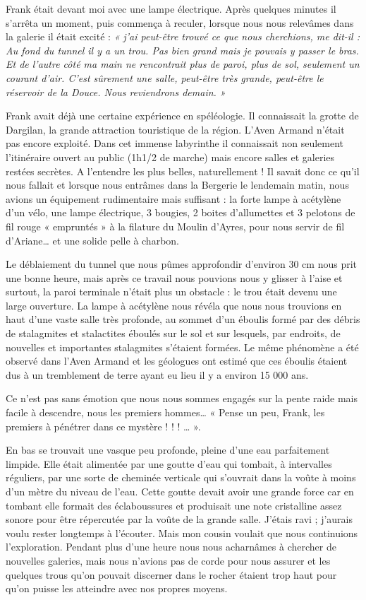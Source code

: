 Frank était devant moi avec une lampe électrique. Après quelques minutes il s’arrêta un
moment, puis commença à reculer, lorsque nous nous relevâmes dans la galerie il était excité :
\textit{« j’ai peut-être trouvé ce que nous cherchions, me dit-il : Au fond du tunnel il y a un trou.
Pas bien grand mais je pouvais y passer le bras. Et de l’autre côté ma main ne rencontrait
plus de paroi, plus de sol, seulement un courant d’air. C’est sûrement une salle, peut-être
très grande, peut-être le réservoir de la Douce. Nous reviendrons demain. »}

Frank avait déjà une certaine expérience en spéléologie. Il connaissait la grotte de Dargilan, la
grande attraction touristique de la région. L’Aven Armand n’était pas encore exploité. Dans
cet immense labyrinthe il connaissait non seulement l’itinéraire ouvert au public (1h1/2 de
marche) mais encore salles et galeries restées secrètes. A l’entendre les plus belles,
naturellement ! Il savait donc ce qu’il nous fallait et lorsque nous entrâmes dans la Bergerie le
lendemain matin, nous avions un équipement rudimentaire mais suffisant : la forte lampe à
acétylène d’un vélo, une lampe électrique, 3 bougies, 2 boites d’allumettes et 3 pelotons de fil
rouge « empruntés » à la filature du Moulin d’Ayres, pour nous servir de fil d’Ariane… et une
solide pelle à charbon.

Le déblaiement du tunnel que nous pûmes approfondir d’environ 30 cm nous prit une bonne
heure, mais après ce travail nous pouvions nous y glisser à l’aise et surtout, la paroi terminale
n’était plus un obstacle : le trou était devenu une large ouverture. La lampe à acétylène nous
révéla que nous nous trouvions en haut d’une vaste salle très profonde, au sommet d’un
éboulis formé par des débris de stalagmites et stalactites éboulés sur le sol et sur lesquels, par
endroits, de nouvelles et importantes stalagmites s’étaient formées. Le même phénomène a été
observé dans l’Aven Armand et les géologues ont estimé que ces éboulis étaient dus à un
tremblement de terre ayant eu lieu il y a environ 15 000 ans.

Ce n’est pas sans émotion que nous nous sommes engagés sur la pente raide mais facile à
descendre, nous les premiers hommes… « Pense un peu, Frank, les premiers à pénétrer dans
ce mystère ! ! ! … ».

En bas se trouvait une vasque peu profonde, pleine d’une eau parfaitement limpide. Elle était
alimentée par une goutte d’eau qui tombait, à intervalles réguliers, par une sorte de cheminée
verticale qui s’ouvrait dans la voûte à moins d’un mètre du niveau de l’eau. Cette goutte
devait avoir une grande force car en tombant elle formait des éclaboussures et produisait une
note cristalline assez sonore pour être répercutée par la voûte de la grande salle. J’étais ravi ;
j’aurais voulu rester longtemps à l’écouter. Mais mon cousin voulait que nous continuions
l’exploration. Pendant plus d’une heure nous nous acharnâmes à chercher de nouvelles
galeries, mais nous n’avions pas de corde pour nous assurer et les quelques trous qu’on
pouvait discerner dans le rocher étaient trop haut pour qu’on puisse les atteindre avec nos
propres moyens.

